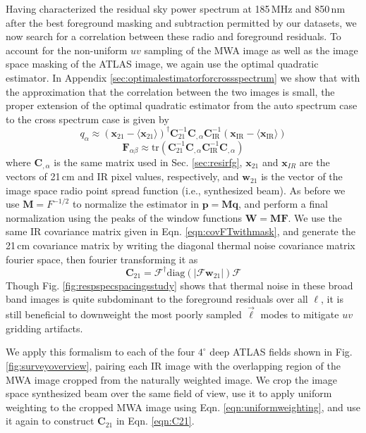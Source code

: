 \documentclass{emulateapj}
\newcommand{\IR}{\text{IR}}
\newcommand{\Fb}{\mathbf{F}}
\newcommand{\Mb}{\mathbf{M}}
\newcommand{\Cb}{\mathbf{C}}
\newcommand{\xb}{\mathbf{x}}
\newcommand{\pb}{\mathbf{p}}
\newcommand{\qb}{\mathbf{q}}
\newcommand{\Wb}{\mathbf{W}}
\begin{document}
Having characterized the residual sky power spectrum at 185\,MHz and 850\,nm after the best foreground masking and subtraction permitted by our datasets, we now search for a correlation between these radio and foreground residuals. To account for the non-uniform $uv$ sampling of the MWA image as well as the image space masking of the ATLAS image, we again use the optimal quadratic estimator. In Appendix \ref{sec:optimalestimatorforcrossspectrum} we show that with the approximation that the correlation between the two images is small, the proper extension of the optimal quadratic estimator from the auto spectrum case to the cross spectrum case is given by
\begin{equation}
q_\alpha \approx (\xb_{21}-\langle\xb_{21}\rangle)^\dagger \Cb_{21}^{-1} \Cb_{,\alpha}\Cb_\IR^{-1}(\xb_\IR-\langle\xb_\IR\rangle)
\end{equation}
\begin{equation}
\Fb_{\alpha\beta}\approx\text{tr}\left(\Cb_{21}^{-1} \Cb_{,\alpha} \Cb_\IR^{-1}  \Cb_{,\alpha}  \right)	
\end{equation}
where $\Cb_{,\alpha}$ is the same matrix used in Sec. \ref{sec:resirfg}, $\mathbf{x}_{21}$ and $\mathbf{x}_{IR}$ are the vectors of 21\,cm and IR pixel values, respectively, and $\mathbf{w}_{21}$ is the vector of the image space radio point spread function (i.e., synthesized beam). As before we use $\Mb=F^{-1/2}$ to normalize the estimator in  $\pb=\Mb\qb$, and perform a final normalization using the peaks of the window functions $\Wb=\Mb\Fb$. We use the same IR covariance matrix given in Eqn. \ref{eqn:covFTwithmask}, and generate the 21\,cm covariance matrix by writing the diagonal thermal noise covariance matrix fourier space, then fourier transforming it as
\begin{equation}
\label{eqn:C21}
\Cb_{21} = \mathcal{F}^\dagger\text{diag}(|\mathcal{F}\mathbf{w}_{21}|)\mathcal{F}
\end{equation}
Though Fig. \ref{fig:respspecspacingsstudy} shows that thermal noise in these broad band images is quite subdominant to the foreground residuals over all $\ell$, it is still beneficial to downweight the most poorly sampled $\vec{\ell}$ modes to mitigate $uv$ gridding artifacts. 

We apply this formalism to each of the four $4^\circ$ deep ATLAS fields shown in Fig. \ref{fig:surveyoverview}, pairing each IR image with the overlapping region of the MWA image cropped from the naturally weighted image. We crop the image space synthesized beam over the same field of view, use it to apply uniform weighting to the cropped MWA image using Eqn. \ref{eqn:uniformweighting}, and use it again to construct $\Cb_{21}$ in Eqn. \ref{eqn:C21}. 
\end{document}
